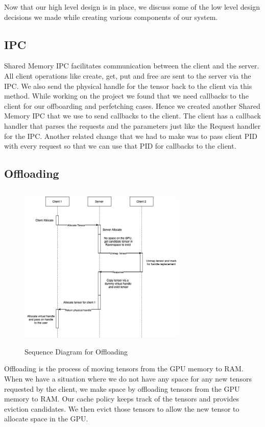 \documentclass{article}
\begin{document}
Now that our high level design is in place, we discuss some of the low level design decisions we made
while creating various components of our system.

\subsection{IPC}
Shared Memory IPC facilitates communication between the client and the server. All client operations like
create, get, put and free are sent to the server via the IPC. We also send the physical handle for the 
tensor back to the client via this method. While working on the project we found that we need
callbacks to the client for our offboarding and perfetching cases. Hence we created another Shared Memory IPC 
that we use to send callbacks to the client. The client has a callback handler that parses the requests and the 
parameters just like the Request handler for the IPC. Another related change that we had to make was to pass
client PID with every request so that we can use that PID for callbacks to the client.

\subsection{Offloading}
\begin{figure}[!htbp]
	\centering
	\includegraphics[height=8cm, width=8cm]{figures/Offloading.png}
	\caption{Sequence Diagram for Offloading}
\end{figure}
\FloatBarrier

Offloading is the process of moving tensors from the GPU memory to RAM. When we have a situation where we do
not have any space for any new tensors requested by the client, we make space by offloading tensors from the
GPU memory to RAM. Our cache policy keeps track of the tensors and provides eviction candidates. We then 
evict those tensors to allow the new tensor to allocate space in the GPU.
\end{document}
